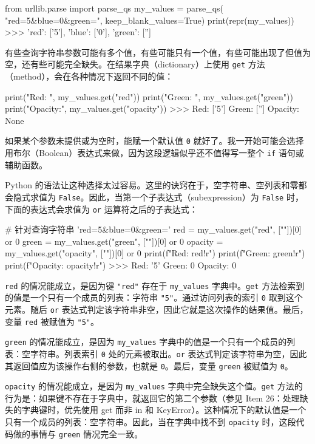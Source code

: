 \begin{codebox}[python]
from urllib.parse import parse_qs
my_values = parse_qs( "red=5&blue=0&green=",
keep_blank_values=True)
print(repr(my_values))
>>>
{'red': ['5'], 'blue': ['0'], 'green': ['']}
\end{codebox}

有些查询字符串参数可能有多个值，有些可能只有一个值，有些可能出现了但值为空，还有些可能完全缺失。在结果字典（dictionary）上使用 \texttt{get} 方法（method），会在各种情况下返回不同的值：

\begin{codebox}[python]
print("Red:    ", my_values.get("red"))
print("Green:  ", my_values.get("green"))
print("Opacity:", my_values.get("opacity"))
>>>
Red:     ['5']
Green:   ['']
Opacity: None
\end{codebox}

如果某个参数未提供或为空时，能赋一个默认值 \texttt{0} 就好了。我一开始可能会选择用布尔（Boolean）表达式来做，因为这段逻辑似乎还不值得写一整个 \texttt{if} 语句或辅助函数。

Python 的语法让这种选择太过容易。这里的诀窍在于，空字符串、空列表和零都会隐式求值为 \texttt{False}。因此，当第一个子表达式（subexpression）为 \texttt{False} 时，下面的表达式会求值为 \texttt{or} 运算符之后的子表达式：

\begin{codebox}[python]
# 针对查询字符串 'red=5&blue=0&green='
red = my_values.get("red", [""])[0] or 0
green = my_values.get("green", [""])[0] or 0
opacity = my_values.get("opacity", [""])[0] or 0
print(f"Red:     {red!r}")
print(f"Green:   {green!r}")
print(f"Opacity: {opacity!r}")
>>>
Red:     '5'
Green:   0
Opacity: 0
\end{codebox}

\texttt{red} 的情况能成立，是因为键 \texttt{"red"} 存在于 \texttt{my\_values} 字典中。\texttt{get} 方法检索到的值是一个只有一个成员的列表：字符串 \texttt{"5"}。通过访问列表的索引 \texttt{0} 取到这个元素。随后 \texttt{or} 表达式判定该字符串非空，因此它就是这次操作的结果值。最后，变量 \texttt{red} 被赋值为 \texttt{"5"}。

\texttt{green} 的情况能成立，是因为 \texttt{my\_values} 字典中的值是一个只有一个成员的列表：空字符串。列表索引 \texttt{0} 处的元素被取出。\texttt{or} 表达式判定该字符串为空，因此其返回值应为该操作右侧的参数，也就是 \texttt{0}。最后，变量 \texttt{green} 被赋值为 \texttt{0}。

\texttt{opacity} 的情况能成立，是因为 \texttt{my\_values} 字典中完全缺失这个值。\texttt{get} 方法的行为是：如果键不存在于字典中，就返回它的第二个参数（参见 Item 26：处理缺失的字典键时，优先使用 get 而非 in 和 KeyError）。这种情况下的默认值是一个只有一个成员的列表：空字符串。因此，当在字典中找不到 \texttt{opacity} 时，这段代码做的事情与 \texttt{green} 情况完全一致。

